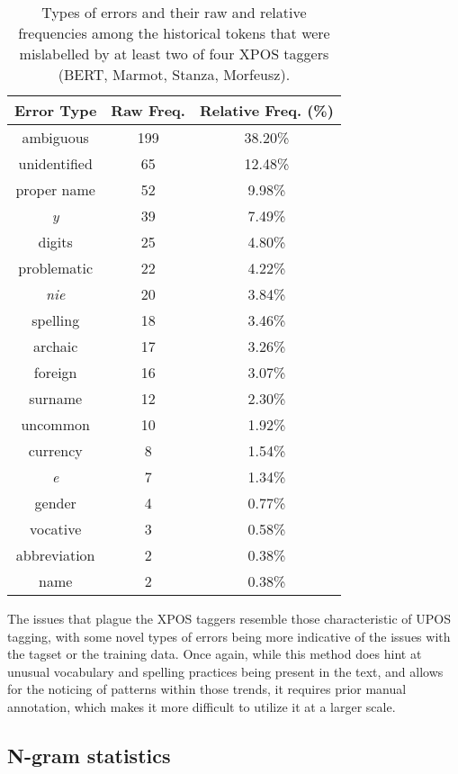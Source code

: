 \renewcommand{\arraystretch}{1.25}
\begin{table}[H]
\begin{center}
\begin{tabular}{|c|cc|}
\hline \bf Error Type & \bf Raw Freq. & \bf Relative Freq. (\%) \\ \hline
ambiguous & 199 & 38.20\% \\
unidentified & 65 & 12.48\% \\
proper name & 52 & 9.98\% \\
\textit{y} & 39 & 7.49\% \\
digits & 25 & 4.80\% \\
problematic & 22 & 4.22\% \\
\textit{nie} & 20 & 3.84\% \\
spelling & 18 & 3.46\% \\
archaic & 17 & 3.26\% \\
foreign & 16 & 3.07\% \\
surname & 12 & 2.30\% \\
uncommon & 10 & 1.92\% \\
currency & 8 & 1.54\% \\
\textit{e} & 7 & 1.34\% \\
gender & 4 & 0.77\% \\
vocative & 3 & 0.58\% \\
abbreviation & 2 & 0.38\% \\
name & 2 & 0.38\% \\
\hline
\end{tabular}
\caption{\label{table:xpos-errors} Types of errors and their raw and relative frequencies among the historical tokens that were mislabelled by at least two of four XPOS taggers (BERT, Marmot, Stanza, Morfeusz).}
\end{center}
\end{table}

The issues that plague the XPOS taggers resemble those characteristic of UPOS tagging, with some novel types of errors being more indicative of the issues with the tagset or the training data. Once again, while this method does hint at unusual vocabulary and spelling practices being present in the text, and allows for the noticing of patterns within those trends, it requires prior manual annotation, which makes it more difficult to utilize it at a larger scale.

\subsection{N-gram statistics}
\label{subsec:ngram-stats-results}

